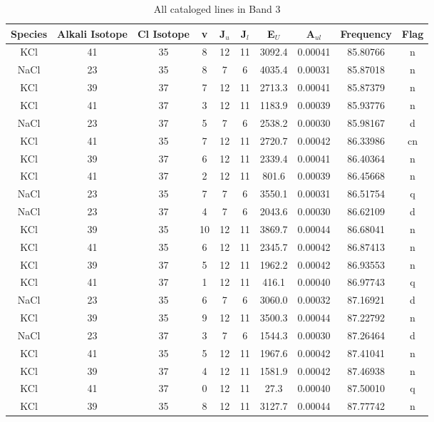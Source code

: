 \begin{table*}[htp]
\centering
\caption{All cataloged lines in Band 3}
\begin{tabular}{cccccccccc}
\label{tab:all_detections_B3}
Species & Alkali Isotope & Cl Isotope & v & J$_u$ & J$_l$ & E$_U$ & A$_{ul}$ & Frequency & Flag \\
\hline
KCl & 41 & 35 & 8 & 12 & 11 & 3092.4 & 0.00041 & 85.80766 & n \\
NaCl & 23 & 35 & 8 & 7 & 6 & 4035.4 & 0.00031 & 85.87018 & n \\
KCl & 39 & 37 & 7 & 12 & 11 & 2713.3 & 0.00041 & 85.87379 & n \\
KCl & 41 & 37 & 3 & 12 & 11 & 1183.9 & 0.00039 & 85.93776 & n \\
NaCl & 23 & 37 & 5 & 7 & 6 & 2538.2 & 0.00030 & 85.98167 & d \\
KCl & 41 & 35 & 7 & 12 & 11 & 2720.7 & 0.00042 & 86.33986 & cn \\
KCl & 39 & 37 & 6 & 12 & 11 & 2339.4 & 0.00041 & 86.40364 & n \\
KCl & 41 & 37 & 2 & 12 & 11 & 801.6 & 0.00039 & 86.45668 & n \\
NaCl & 23 & 35 & 7 & 7 & 6 & 3550.1 & 0.00031 & 86.51754 & q \\
NaCl & 23 & 37 & 4 & 7 & 6 & 2043.6 & 0.00030 & 86.62109 & d \\
KCl & 39 & 35 & 10 & 12 & 11 & 3869.7 & 0.00044 & 86.68041 & n \\
KCl & 41 & 35 & 6 & 12 & 11 & 2345.7 & 0.00042 & 86.87413 & n \\
KCl & 39 & 37 & 5 & 12 & 11 & 1962.2 & 0.00042 & 86.93553 & n \\
KCl & 41 & 37 & 1 & 12 & 11 & 416.1 & 0.00040 & 86.97743 & q \\
NaCl & 23 & 35 & 6 & 7 & 6 & 3060.0 & 0.00032 & 87.16921 & d \\
KCl & 39 & 35 & 9 & 12 & 11 & 3500.3 & 0.00044 & 87.22792 & n \\
NaCl & 23 & 37 & 3 & 7 & 6 & 1544.3 & 0.00030 & 87.26464 & d \\
KCl & 41 & 35 & 5 & 12 & 11 & 1967.6 & 0.00042 & 87.41041 & n \\
KCl & 39 & 37 & 4 & 12 & 11 & 1581.9 & 0.00042 & 87.46938 & n \\
KCl & 41 & 37 & 0 & 12 & 11 & 27.3 & 0.00040 & 87.50010 & q \\
KCl & 39 & 35 & 8 & 12 & 11 & 3127.7 & 0.00044 & 87.77742 & n \\

\end{tabular}
\end{table*}
